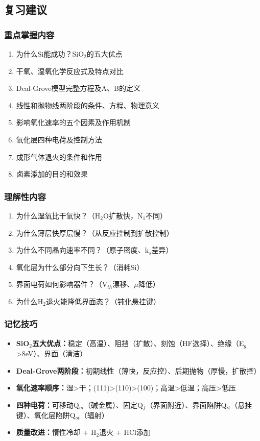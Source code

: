 \documentclass[UTF8,12pt,a4paper]{ctexart}
\begin{document}
\subsection{复习建议}

\subsubsection{重点掌握内容}

\begin{enumerate}
    \item 为什么Si能成功？SiO$_2$的五大优点
    \item 干氧、湿氧化学反应式及特点对比
    \item Deal-Grove模型完整方程及A、B的定义
    \item 线性和抛物线两阶段的条件、方程、物理意义
    \item 影响氧化速率的五个因素及作用机制
    \item 氧化层四种电荷及控制方法
    \item 成形气体退火的条件和作用
    \item 卤素添加的目的和效果
\end{enumerate}

\subsubsection{理解性内容}

\begin{enumerate}
    \item 为什么湿氧比干氧快？（H$_2$O扩散快，N$_1$不同）
    \item 为什么薄层快厚层慢？（从反应控制到扩散控制）
    \item 为什么不同晶向速率不同？（原子密度、k$_s$差异）
    \item 氧化层为什么部分向下生长？（消耗Si）
    \item 界面电荷如何影响器件？（V$_{th}$漂移、$\mu$降低）
    \item 为什么H$_2$退火能降低界面态？（钝化悬挂键）
\end{enumerate}

\subsubsection{记忆技巧}

\begin{itemize}
    \item \textbf{SiO$_2$五大优点：}稳定（高温）、阻挡（扩散）、刻蚀（HF选择）、绝缘（E$_g$>8eV）、界面（清洁）
    \item \textbf{Deal-Grove两阶段：}初期线性（薄快，反应控）、后期抛物（厚慢，扩散控）
    \item \textbf{氧化速率顺序：}湿>干；(111)>(110)>(100)；高温>低温；高压>低压
    \item \textbf{四种电荷：}可移动Q$_m$（碱金属）、固定Q$_f$（界面附近）、界面陷阱Q$_{it}$（悬挂键）、氧化层陷阱Q$_{ot}$（辐射）
    \item \textbf{质量改进：}惰性冷却 + H$_2$退火 + HCl添加
\end{itemize}
\newpage
\end{document}
